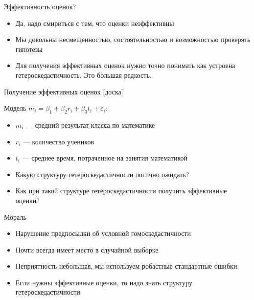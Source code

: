 \documentclass[ignorenonframetext,]{beamer}
\newcommand{\e}{\varepsilon}
\begin{document}
\begin{frame}{Эффективность оценок?}

\begin{itemize}
\item
  Да, надо смириться с тем, что оценки неэффективны
\item
  Мы довольны несмещенностью, состоятельностью и возможностью проверять
  гипотезы
\item
  Для получения эффективных оценок нужно точно понимать как устроена
  гетероскедастичность. Это большая редкость.
\end{itemize}

\end{frame}

\begin{frame}{Получение эффективных оценок {[}доска{]}}

Модель \(m_i = \beta_1 + \beta_2 r_i + \beta_3 t_i + \e_i\):

\begin{itemize}
\item
  \(m_i\) --- средний результат класса по математике
\item
  \(r_i\) --- количество учеников
\item
  \(t_i\) --- среднее время, потраченное на занятия математикой
\item
  Какую структуру гетероскедастичности логично ожидать?
\item
  Как при такой структуре гетероскедастичности получить эффективные
  оценки?
\end{itemize}

\end{frame}

\begin{frame}{Мораль}

\begin{itemize}
\item
  Нарушение предпосылки об условной гомоскедастичности
\item
  Почти всегда имеет место в случайной выборке
\item
  Неприятность небольшая, мы используем робастные стандартные ошибки
\item
  Если нужны эффективные оценки, то надо знать структуру
  гетероскедастичности
\end{itemize}

\end{frame}
\end{document}

